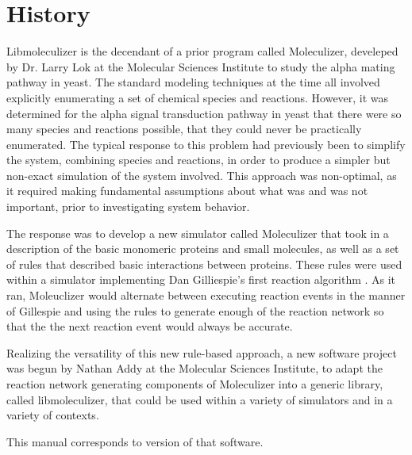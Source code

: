 \section{History}

Libmoleculizer is the decendant of a prior program called Moleculizer,
develeped by Dr. Larry Lok at the Molecular Sciences Institute to
study the alpha mating pathway in yeast. The standard modeling
techniques at the time all involved explicitly enumerating a set of
chemical species and reactions. However, it was determined for the
alpha signal transduction pathway in yeast that there were so many
species and reactions possible, that they could never be practically
enumerated. The typical response to this problem had previously been
to simplify the system, combining species and reactions, in order to
produce a simpler but non-exact simulation of the system
involved. This approach was non-optimal, as it required making
fundamental assumptions about what was and was not important, prior to
investigating system behavior.

The response was to develop a new simulator called
Moleculizer\cite{lok05} that took in a description of the basic
monomeric proteins and small molecules, as well as a set of rules that
described basic interactions between proteins. These rules were used
within a simulator implementing Dan Gilliespie's first reaction
algorithm \cite{gillespie77}.  As it ran, Moleuclizer would alternate
between executing reaction events in the manner of Gillespie and using
the rules to generate enough of the reaction network so that the
 the next reaction event would always be accurate.

Realizing the versatility of this new rule-based approach, a new
software project was begun by Nathan Addy at the Molecular Sciences
Institute, to adapt the reaction network generating components of
Moleculizer into a generic library, called libmoleculizer, that could
be used within a variety of simulators and in a variety of contexts.

This manual corresponds to version \currentversion of that software. 